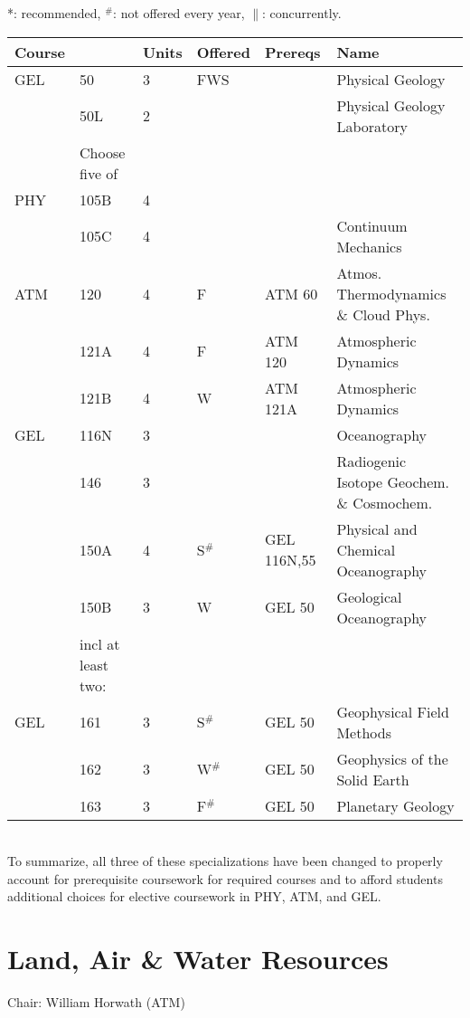 \documentclass[12pt]{article}
\begin{document}
\vskip 0.25cm
\noindent
*: recommended, $^\#$: not offered every year, $\parallel$: concurrently.\\
\begin{tabular}{|llllll|}
\hline
Course & & Units & Offered & Prereqs & Name \\
\hline
GEL & 50     & 3 & FWS & & Physical Geology \\
    & 50L    & 2 &     & & Physical Geology Laboratory\\
\hline
\hline
    & Choose five of & & & & \\
\hline
PHY  & 105B   & 4 & &  & \\
     & 105C   & 4 & &  & Continuum Mechanics\\
ATM  & 120    & 4 & F  & ATM 60    & Atmos. Thermodynamics \& Cloud Phys. \\
     & 121A   & 4 & F  & ATM 120   & Atmospheric Dynamics \\
     & 121B   & 4 & W  & ATM 121A  & Atmospheric Dynamics \\
GEL  & 116N   & 3 &    & & Oceanography\\
     & 146    & 3 &    & & Radiogenic Isotope Geochem. \& Cosmochem. \\
     & 150A   & 4 & S$^\#$ & GEL 116N,55 & Physical and Chemical Oceanography\\
     & 150B   & 3 & W  & GEL 50      & Geological Oceanography\\
\hline
     & incl at least two:  & & & & \\
\hline
GEL  & 161    & 3 & S$^\#$ & GEL 50 & Geophysical Field Methods \\
     & 162    & 3 & W$^\#$ & GEL 50 & Geophysics of the Solid Earth \\
     & 163    & 3 & F$^\#$ & GEL 50 & Planetary Geology \\
\hline
\end{tabular}\\

To summarize, all three of these specializations have been changed to
properly account for prerequisite coursework for required courses and
to afford students additional choices for elective coursework in PHY,
ATM, and GEL.

\newpage
\section{Land, Air \& Water Resources}
Chair: William Horwath (ATM)
\end{document}
